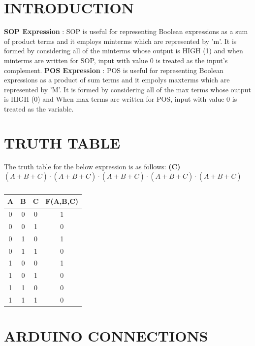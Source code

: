 \documentclass[a4paper,11pt,twocolumn]{article}
\providecommand{\brak}[1]{\ensuremath{\left(#1\right)}}
\begin{document}
\section{INTRODUCTION}
\textbf{SOP Expression} : SOP is useful for representing Boolean expressions as a sum of product terms and it employs minterms which are represented by 'm'. It is formed by considering all of the minterms whose output is HIGH (1) and when minterms are written for SOP, input with value 0 is treated as the input's complement.\newline
\textbf{POS Expression} : POS is useful for representing Boolean expressions as a product of sum terms and it empolys maxterms which are represented by 'M'. It is formed by considering all of the max terms whose output is HIGH (0) and When max terms are written for POS, input with value 0 is treated as the variable.
\bigskip

\section{TRUTH TABLE}
The truth table for the below expression is as follows:
\newline  \textbf{(C)} $ \brak{A+B+\overline{C}} \cdot \brak{A+\overline{B}+\overline{C}} \cdot \brak{\overline{A}+B+\overline{C}} \cdot \brak{\overline{A}+\overline{B}+C} \cdot \brak{\overline{A}+\overline{B}+C} $
\begin{table}[h!]
	\centering
	\begin{tabular}{ |c |c |c |c | }
		\hline
		\newline
		\textbf{A} & \textbf{B} & \textbf{C} & \textbf{F(A,B,C)}\\
		\hline
		0 & 0 & 0 & 1 \\
                0 & 0 & 1 & 0 \\
		0 & 1 & 0 & 1 \\
		0 & 1 & 1 & 0 \\
		1 & 0 & 0 & 1 \\
		1 & 0 & 1 & 0 \\
		1 & 1 & 0 & 0 \\
		1 & 1 & 1 & 0 \\
		\hline
        \end{tabular}
  \caption{}
\end{table}
\bigskip

\section{ARDUINO CONNECTIONS}
\end{document}
